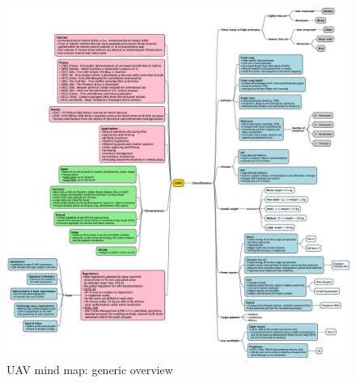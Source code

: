 \begin{figure}[!hbt]
  \centering
  \includegraphics[width=1.0\textwidth]{./img/eps/uav-mindmap.eps} 
%   
  \caption{UAV mind map: generic overview}%
  \label{fig:uav-mindmap}
\end{figure}
%
%
